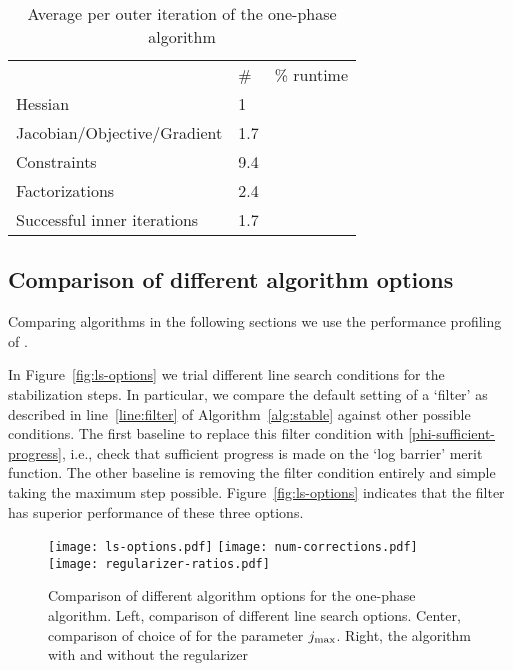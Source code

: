 \documentclass{article}
\begin{document}
\begin{table}[H]
\begin{tabular}{l  l l}
&   \# & \% runtime \\ 
Hessian & 1 \\  
Jacobian/Objective/Gradient & 1.7 & \\
Constraints & 9.4 & \\
Factorizations & 2.4 & \\
Successful inner iterations & 1.7 & \\
\end{tabular}
\caption{Average per outer iteration of the one-phase algorithm}
\end{table}




\subsection{Comparison of different algorithm options}\label{alg:comparison-options}

Comparing algorithms in the following sections we use the performance profiling of \cite{dolan2002benchmarking}.



In Figure~\ref{fig:ls-options} we trial different line search conditions for the stabilization steps. In particular, we compare the default setting of a `filter' as described in line~\ref{line:filter} of Algorithm~\ref{alg:stable} against other possible conditions. The first baseline to replace this filter condition with  \eqref{phi-sufficient-progress}, i.e., check that sufficient progress is made on the `log barrier' merit function. The other baseline is removing the filter condition entirely and simple taking the maximum step possible. Figure~\ref{fig:ls-options} indicates that the filter has superior performance of these three options.

\begin{figure}[H]
\texttt{[image: ls-options.pdf]}
\texttt{[image: num-corrections.pdf]}
\texttt{[image: regularizer-ratios.pdf]}
\caption{Comparison of different algorithm options for the one-phase algorithm. Left, comparison of different line search options. Center, comparison of choice of for the parameter $j_{\max}$. Right, the algorithm with and without the regularizer}
\label{fig:alg-options}
\end{figure}
\end{document}
